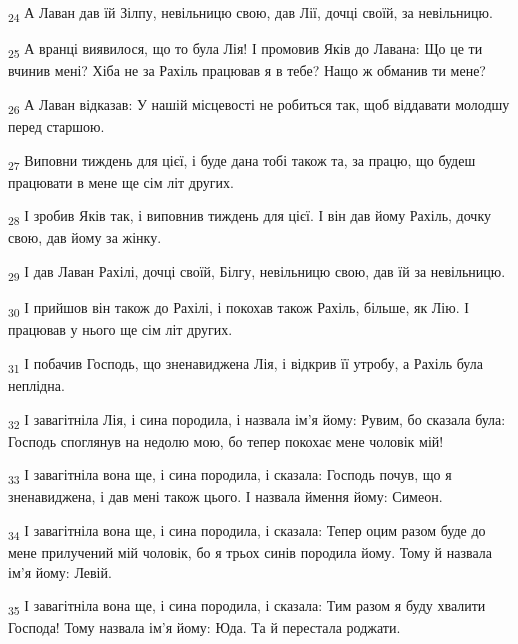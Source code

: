 \begin{tcolorbox}
\textsubscript{24} А Лаван дав їй Зілпу, невільницю свою, дав Лії, дочці своїй, за невільницю.
\end{tcolorbox}
\begin{tcolorbox}
\textsubscript{25} А вранці виявилося, що то була Лія! І промовив Яків до Лавана: Що це ти вчинив мені? Хіба не за Рахіль працював я в тебе? Нащо ж обманив ти мене?
\end{tcolorbox}
\begin{tcolorbox}
\textsubscript{26} А Лаван відказав: У нашій місцевості не робиться так, щоб віддавати молодшу перед старшою.
\end{tcolorbox}
\begin{tcolorbox}
\textsubscript{27} Виповни тиждень для цієї, і буде дана тобі також та, за працю, що будеш працювати в мене ще сім літ других.
\end{tcolorbox}
\begin{tcolorbox}
\textsubscript{28} І зробив Яків так, і виповнив тиждень для цієї. І він дав йому Рахіль, дочку свою, дав йому за жінку.
\end{tcolorbox}
\begin{tcolorbox}
\textsubscript{29} І дав Лаван Рахілі, дочці своїй, Білгу, невільницю свою, дав їй за невільницю.
\end{tcolorbox}
\begin{tcolorbox}
\textsubscript{30} І прийшов він також до Рахілі, і покохав також Рахіль, більше, як Лію. І працював у нього ще сім літ других.
\end{tcolorbox}
\begin{tcolorbox}
\textsubscript{31} І побачив Господь, що зненавиджена Лія, і відкрив її утробу, а Рахіль була неплідна.
\end{tcolorbox}
\begin{tcolorbox}
\textsubscript{32} І завагітніла Лія, і сина породила, і назвала ім'я йому: Рувим, бо сказала була: Господь споглянув на недолю мою, бо тепер покохає мене чоловік мій!
\end{tcolorbox}
\begin{tcolorbox}
\textsubscript{33} І завагітніла вона ще, і сина породила, і сказала: Господь почув, що я зненавиджена, і дав мені також цього. І назвала ймення йому: Симеон.
\end{tcolorbox}
\begin{tcolorbox}
\textsubscript{34} І завагітніла вона ще, і сина породила, і сказала: Тепер оцим разом буде до мене прилучений мій чоловік, бо я трьох синів породила йому. Тому й назвала ім'я йому: Левій.
\end{tcolorbox}
\begin{tcolorbox}
\textsubscript{35} І завагітніла вона ще, і сина породила, і сказала: Тим разом я буду хвалити Господа! Тому назвала ім'я йому: Юда. Та й перестала роджати.
\end{tcolorbox}
